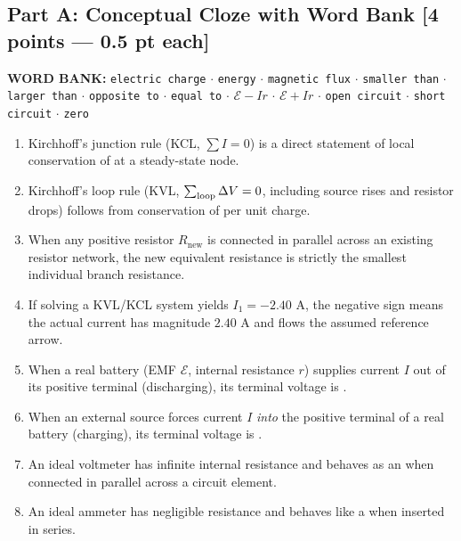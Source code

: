 \documentclass[10pt,letterpaper]{article}
\begin{document}
\subsection*{Part A: Conceptual Cloze with Word Bank [4 points --- 0.5 pt each]}
\noindent\colorbox{pale}{\parbox{\dimexpr\linewidth-2\fboxsep\relax}{%
\textbf{WORD BANK:} \texttt{electric charge} $\cdot$ \texttt{energy} $\cdot$ \texttt{magnetic flux} $\cdot$ \texttt{smaller than} $\cdot$ \texttt{larger than} $\cdot$ \texttt{opposite to} $\cdot$ \texttt{equal to} $\cdot$ \texttt{$\mathcal{E} - Ir$} $\cdot$ \texttt{$\mathcal{E} + Ir$} $\cdot$ \texttt{open circuit} $\cdot$ \texttt{short circuit} $\cdot$ \texttt{zero}%
}}
\begin{enumerate}
  \item[(a)] Kirchhoff's junction rule (KCL, $\sum I = 0$) is a direct statement of local conservation of \underline{\hspace{2.2in}} at a steady-state node.
  \item[(b)] Kirchhoff's loop rule (KVL, $\sum_{\rm loop} \Delta V = 0$, including source rises and resistor drops) follows from conservation of \underline{\hspace{2.2in}} per unit charge.
  \item[(c)] When any positive resistor $R_{\text{new}}$ is connected in parallel across an existing resistor network, the new equivalent resistance is strictly \underline{\hspace{2.2in}} the smallest individual branch resistance.
  \item[(d)] If solving a KVL/KCL system yields $I_1 = -2.40\text{ A}$, the negative sign means the actual current has magnitude $2.40\text{ A}$ and flows \underline{\hspace{2.2in}} the assumed reference arrow.
  \item[(e)] When a real battery (EMF $\mathcal{E}$, internal resistance $r$) supplies current $I$ out of its positive terminal (discharging), its terminal voltage is \underline{\hspace{2.2in}}.
  \item[(f)] When an external source forces current $I$ \emph{into} the positive terminal of a real battery (charging), its terminal voltage is \underline{\hspace{2.2in}}.
  \item[(g)] An ideal voltmeter has infinite internal resistance and behaves as an \underline{\hspace{2.2in}} when connected in parallel across a circuit element.
  \item[(h)] An ideal ammeter has negligible resistance and behaves like a \underline{\hspace{2.2in}} when inserted in series.
\end{enumerate}
\end{document}
